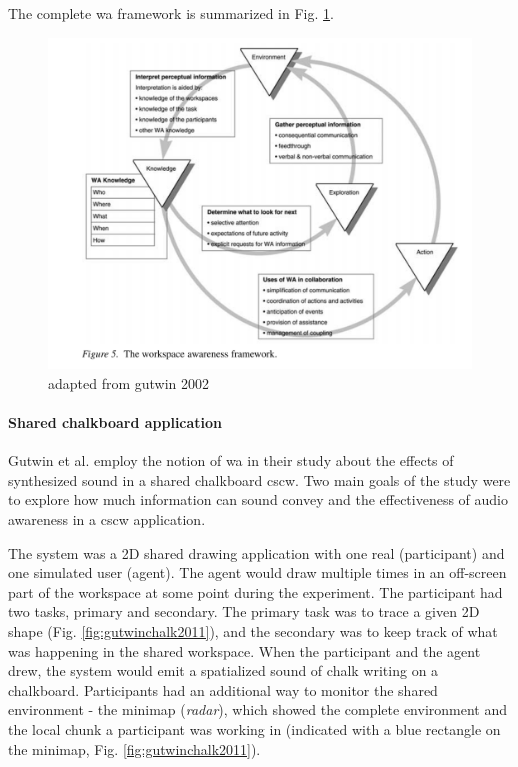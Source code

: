 The complete \gls{wa} framework is summarized in Fig. \ref{fig:waframework}.

\begin{figure}
	\centering
	\includegraphics[width=0.7\linewidth]{figures/placeholders/WA_framework}
	\caption{adapted from gutwin 2002}
	\label{fig:waframework}
\end{figure}


\paragraph{Shared chalkboard application} 
\label{par:shared_chalkboard_application}
Gutwin et al. \cite{gutwin_chalk_2011} employ the notion of \gls{wa} in their study about the effects of synthesized sound in a shared chalkboard \gls{cscw}.
Two main goals of the study were to explore how much information can sound convey and the effectiveness of audio awareness in a \gls{cscw} application.

The system was a 2D shared drawing application with one real (participant) and one simulated user (agent). The agent would draw multiple times in an off-screen part of the workspace at some point during the experiment. The participant had two tasks, primary and secondary. The primary task was to trace a given 2D shape (Fig. \ref{fig:gutwinchalk2011}), and the secondary was to keep track of what was happening in the shared workspace. When the participant and the agent drew, the system would emit a spatialized sound of chalk writing on a chalkboard. Participants had an additional way to monitor the shared environment -
the minimap (\textit{radar}), which showed the complete environment and the local chunk a participant was working in (indicated with a blue rectangle on the minimap, Fig. \ref{fig:gutwinchalk2011}).


